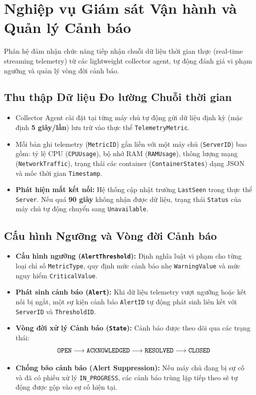 \section{Nghiệp vụ Giám sát Vận hành và Quản lý Cảnh báo}
Phân hệ đảm nhận chức năng tiếp nhận chuỗi dữ liệu thời gian thực (real-time streaming telemetry) từ các lightweight collector agent, tự động đánh giá vi phạm ngưỡng và quản lý vòng đời cảnh báo.

\subsection{Thu thập Dữ liệu Đo lường Chuỗi thời gian}
\begin{itemize}[leftmargin=2em]
    \item Collector Agent cài đặt tại từng máy chủ tự động gửi dữ liệu định kỳ (mặc định \textbf{5 giây/lần}) lưu trữ vào thực thể \texttt{TelemetryMetric}.
    \item Mỗi bản ghi telemetry (\texttt{MetricID}) gắn liền với một máy chủ (\texttt{ServerID}) bao gồm: tỷ lệ CPU (\texttt{CPUUsage}), bộ nhớ RAM (\texttt{RAMUsage}), thông lượng mạng (\texttt{NetworkTraffic}), trạng thái các container (\texttt{ContainerStates}) dạng JSON và mốc thời gian \texttt{Timestamp}.
    \item \textbf{Phát hiện mất kết nối:} Hệ thống cập nhật trường \texttt{LastSeen} trong thực thể \texttt{Server}. Nếu quá \textbf{90 giây} không nhận được dữ liệu, trạng thái \texttt{Status} của máy chủ tự động chuyển sang \texttt{Unavailable}.
\end{itemize}

\subsection{Cấu hình Ngưỡng và Vòng đời Cảnh báo}
\begin{itemize}[leftmargin=2em]
    \item \textbf{Cấu hình ngưỡng (\texttt{AlertThreshold}):} Định nghĩa luật vi phạm cho từng loại chỉ số \texttt{MetricType}, quy định mức cảnh báo nhẹ \texttt{WarningValue} và mức nguy hiểm \texttt{CriticalValue}.
    \item \textbf{Phát sinh cảnh báo (\texttt{Alert}):} Khi dữ liệu telemetry vượt ngưỡng hoặc kết nối bị ngắt, một sự kiện cảnh báo \texttt{AlertID} tự động phát sinh liên kết với \texttt{ServerID} và \texttt{ThresholdID}.
    \item \textbf{Vòng đời xử lý Cảnh báo (\texttt{State}):} Cảnh báo được theo dõi qua các trạng thái:
    \begin{equation*}
    \text{\texttt{OPEN}} \longrightarrow \text{\texttt{ACKNOWLEDGED}} \longrightarrow \text{\texttt{RESOLVED}} \longrightarrow \text{\texttt{CLOSED}}
    \end{equation*}
    \item \textbf{Chống bão cảnh báo (Alert Suppression):} Nếu máy chủ đang bị sự cố và đã có phiếu xử lý \texttt{IN\_PROGRESS}, các cảnh báo trùng lặp tiếp theo sẽ tự động được gộp vào sự cố hiện tại.
\end{itemize}
